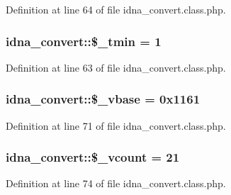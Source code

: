 Definition at line 64 of file idna\+\_\+convert.\+class.\+php.

\hypertarget{classidna__convert_a25ba1aab448cedd1159da1a09fb97720}{}
\subsubsection[{\$\+\_\+tmin}]{\setlength{\rightskip}{0pt plus 5cm}idna\+\_\+convert\+::\$\+\_\+tmin = 1\hspace{0.3cm}{\ttfamily [protected]}}\label{classidna__convert_a25ba1aab448cedd1159da1a09fb97720}


Definition at line 63 of file idna\+\_\+convert.\+class.\+php.

\hypertarget{classidna__convert_a2e984a3fe1e2e4d5192dd9a5220e9c29}{}
\subsubsection[{\$\+\_\+vbase}]{\setlength{\rightskip}{0pt plus 5cm}idna\+\_\+convert\+::\$\+\_\+vbase = 0x1161\hspace{0.3cm}{\ttfamily [protected]}}\label{classidna__convert_a2e984a3fe1e2e4d5192dd9a5220e9c29}


Definition at line 71 of file idna\+\_\+convert.\+class.\+php.

\hypertarget{classidna__convert_afe217921aaa9aa954361f3aa090c69c1}{}
\subsubsection[{\$\+\_\+vcount}]{\setlength{\rightskip}{0pt plus 5cm}idna\+\_\+convert\+::\$\+\_\+vcount = 21\hspace{0.3cm}{\ttfamily [protected]}}\label{classidna__convert_afe217921aaa9aa954361f3aa090c69c1}


Definition at line 74 of file idna\+\_\+convert.\+class.\+php.

\hypertarget{classidna__convert_a82881f4c426f3e6603e252c8bebc875f}{}
